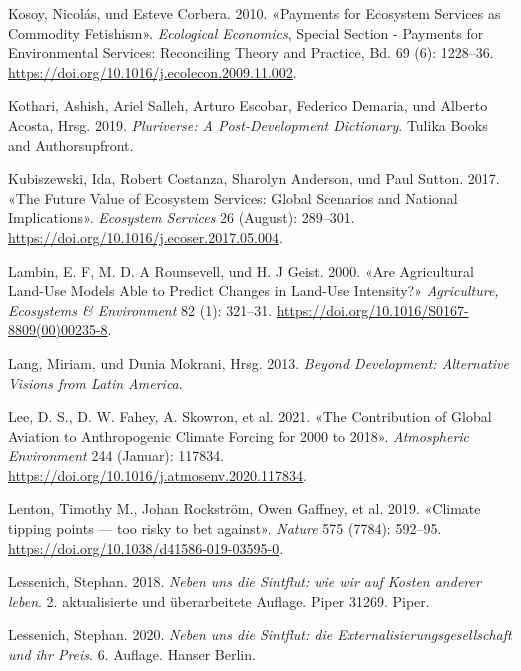 \documentclass[
  nswissgerman,
  a4paper,
  DIV=11,
  numbers=noendperiod,
  oneside,
  openany]{scrreprt}
\newlength{\cslhangindent}
\newenvironment{CSLReferences}[2] %
 {\begin{list}{}{%
  \setlength{\itemindent}{0pt}
  \setlength{\leftmargin}{0pt}
  \setlength{\parsep}{0pt}
  \ifodd #1
   \setlength{\leftmargin}{\cslhangindent}
   \setlength{\itemindent}{-1\cslhangindent}
  \fi
  \setlength{\itemsep}{#2\baselineskip}}}
 {\end{list}}
\begin{document}
\begin{CSLReferences}{1}{1}
Kosoy, Nicolás, und Esteve Corbera. 2010. {«Payments for Ecosystem
Services as Commodity Fetishism»}. \emph{Ecological Economics}, Special
{Section} - {Payments} for {Environmental Services}: {Reconciling
Theory} and {Practice}, Bd. 69 (6): 1228--36.
\url{https://doi.org/10.1016/j.ecolecon.2009.11.002}.

Kothari, Ashish, Ariel Salleh, Arturo Escobar, Federico Demaria, und
Alberto Acosta, Hrsg. 2019. \emph{Pluriverse: A Post-Development
Dictionary}. {Tulika Books and Authorsupfront}.

Kubiszewski, Ida, Robert Costanza, Sharolyn Anderson, und Paul Sutton.
2017. {«The Future Value of Ecosystem Services: {Global} Scenarios and
National Implications»}. \emph{Ecosystem Services} 26 (August):
289--301. \url{https://doi.org/10.1016/j.ecoser.2017.05.004}.

Lambin, E. F, M. D. A Rounsevell, und H. J Geist. 2000. {«Are
Agricultural Land-Use Models Able to Predict Changes in Land-Use
Intensity?»} \emph{Agriculture, Ecosystems \& Environment} 82 (1):
321--31. \url{https://doi.org/10.1016/S0167-8809(00)00235-8}.

Lang, Miriam, und Dunia Mokrani, Hrsg. 2013. \emph{Beyond {Development}:
{Alternative} Visions from {Latin America}}.

Lee, D. S., D. W. Fahey, A. Skowron, et al. 2021. {«The Contribution of
Global Aviation to Anthropogenic Climate Forcing for 2000 to 2018»}.
\emph{Atmospheric Environment} 244 (Januar): 117834.
\url{https://doi.org/10.1016/j.atmosenv.2020.117834}.

Lenton, Timothy M., Johan Rockström, Owen Gaffney, et al. 2019.
{«Climate tipping points --- too risky to bet against»}. \emph{Nature}
575 (7784): 592--95. \url{https://doi.org/10.1038/d41586-019-03595-0}.

Lessenich, Stephan. 2018. \emph{{Neben uns die Sintflut: wie wir auf
Kosten anderer leben}}. 2. aktualisierte und {ü}berarbeitete Auflage.
{Piper} 31269. Piper.

Lessenich, Stephan. 2020. \emph{{Neben uns die Sintflut: die
Externalisierungsgesellschaft und ihr Preis}}. 6. Auflage. Hanser
Berlin.


\end{CSLReferences}
\end{document}
